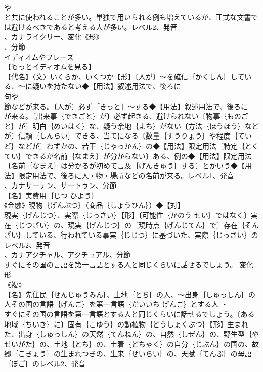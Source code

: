 \documentclass[8pt]{extreport}
\begin{document}
\begin{CJK}{UTF8}{min}
\\	や
\\	と共に使われることが多い。単独で用いられる例も増えているが、正式な文書では避けるべきであると考える人が多い。レベル2、発音
\\	、カナライクリー、変化《形》
\\	、分節
\\	イディオムやフレーズ 
\\	【もっとイディオムを見る】
\\	【代名】〈文〉いくらか、いくつか【形】〔人が〕～を確信｛かくしん｝している、～に疑いを持たない◆【用法】叙述用法で、後ろに
\\	句や
\\	節などが来る。〔人が〕必ず［きっと］～する◆【用法】叙述用法で、後ろに
\\	が来る。〔出来事｛できごと｝が〕必ず起きる、避けられない〔物事｛ものごと｝が〕明白｛めいはく｝な、疑う余地｛よち｝がない〔方法｛ほうほう｝などが〕信頼｛しんらい｝できる、当てになる〔数量｛すうりょう｝や程度｛ていど｝などが〕わずかの、若干｛じゃっかん｝の◆【用法】限定用法〔特定｛とくてい｝できるが名前｛なまえ｝が分からない〕ある、例の◆【用法】限定用法〔名前｛なまえ｝は分かるが初めて言及｛げんきゅう｝する〕とかいう◆【用法】限定用法で、後ろに人・物・場所などの名前が来る。レベル1、発音
\\	、カナサーテン、サートゥン、分節
\\	【名】実費用｛じつ ひよう｝
\\	《金融》現物｛げんぶつ｝（商品｛しょうひん｝）◆【対】
\\	現実｛げんじつ｝、実際｛じっさい｝【形】〔可能性｛かのう せい｝ではなく〕実在｛じつざい｝の、現実｛げんじつ｝の〔現時点｛げんじてん｝で〕存在｛そんざい｝している、行われている事実｛じじつ｝に基づいた、実際｛じっさい｝のレベル2、発音
\\	、カナアクチャル、アクチュアル、分節
\\	すぐにその国の言語を第一言語とする人と同じくらいに話せるでしょう。	変化形 
\\	《複》
\\	【名】先住民｛せんじゅうみん｝、土地｛とち｝の人、～出身｛しゅっしん｝の人その国の言語｛げんご｝を第一言語｛だいいち げんご｝とする人 ・
\\	すぐにその国の言語を第一言語とする人と同じくらいに話せるでしょう。〔ある地域｛ちいき｝に〕固有｛こゆう｝の動植物｛どうしょくぶつ｝【形】生まれた、出身｛しゅっしん｝の天然｛てんねん｝の、自然｛しぜん｝の、野生型｛やせいがた｝の、土地｛とち｝の、土着｛どちゃく｝の自分｛じぶん｝の国の、故郷｛こきょう｝の生まれつきの、生来｛せいらい｝の、天賦｛てんぷ｝の母語｛ぼご｝のレベル2、発音

\end{CJK}
\end{document}
